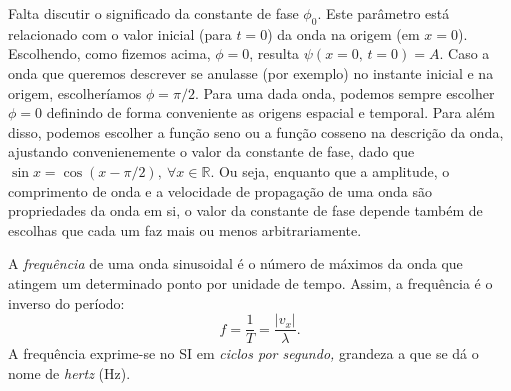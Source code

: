 Falta discutir o significado da constante de fase $\phi_0$. Este parâmetro está
relacionado com o valor inicial (para $t=0$) da onda na origem (em $x=0$).
Escolhendo, como fizemos acima, $\phi=0$, resulta $\psi(x=0,\,t=0)=A$. Caso a onda
que queremos descrever se anulasse (por exemplo) no instante inicial e na
origem, escolheríamos $\phi=\pi/2$. Para uma dada onda, podemos sempre escolher
$\phi=0$ definindo de forma conveniente as origens espacial e temporal. Para
além disso, podemos escolher a função seno ou a função cosseno na descrição da
onda, ajustando convenienemente o valor da constante de fase, dado que $\sin
x=\cos(x-\pi/2),\ \forall x\in \mathbb{R}$. Ou seja, enquanto que a amplitude, o
comprimento de onda e a velocidade de propagação de uma onda são propriedades da
onda em si, o valor da constante de fase depende também de escolhas que cada um
faz mais ou menos arbitrariamente.
 
A \emph{frequência} de uma onda sinusoidal é o número de máximos da onda que
atingem um determinado ponto por unidade de tempo. Assim, a frequência é o
inverso do período:
\begin{equation*}
    f=\frac{1}{T}=\frac{|v_x|}{\lambda}.
\end{equation*}
A frequência exprime-se no SI em \emph{ciclos por segundo,} grandeza a que se dá
o nome de \emph{hertz} (Hz).

